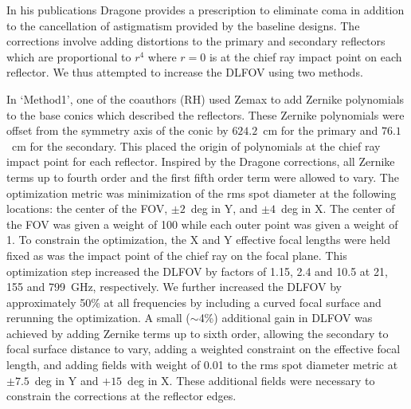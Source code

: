 \documentclass[]{spie}  %
\newcommand{\comr}[1]{\textcolor{red}{#1}}
\newcommand{\comb}[1]{\textcolor{blue}{#1}}
\newcommand{\como}[1]{\textcolor{orange}{#1}}
\begin{document}
In his publications Dragone provides a prescription to eliminate coma
in addition to the cancellation of astigmatism provided by the baseline designs.\cite{dragone_coma} The corrections 
involve adding distortions to the primary and secondary reflectors 
which are proportional to $r^4$ where $r=0$ is at the chief ray impact point on each reflector. 
We thus attempted to increase the DLFOV using two methods. 

In `Method1', one of the coauthors (RH) used Zemax to add Zernike 
polynomials to the base conics which described the reflectors. These Zernike polynomials were offset from the symmetry axis of the conic 
by $624.2$~cm for the primary and $76.1$~cm for the secondary.  
This placed the origin of polynomials at the chief ray impact point for each reflector. 
Inspired by the Dragone corrections, all Zernike terms up to fourth order and the first fifth order term were allowed to vary. 
The optimization metric was minimization of the rms spot diameter at 
the following locations: the center of the FOV, $\pm2$~deg in Y, and $\pm4$~deg in X. The center of the FOV was given a weight of 100
while each outer point was given a weight of 1. To constrain the optimization, the X and Y 
effective focal lengths were held fixed as was the impact point of the chief ray on the focal plane. 
This optimization step increased the DLFOV
by factors of 1.15, 2.4 and 10.5 at 21, 155 and 799~GHz, respectively. 
We further increased the DLFOV by approximately 50\% at all frequencies by including a curved focal surface and rerunning the optimization.
A small ($\sim$4\%) additional gain in DLFOV was achieved by adding Zernike terms 
up to sixth order, allowing the secondary to focal surface distance to vary, adding a weighted constraint on the effective focal length, 
and adding fields with weight of 0.01 to the rms spot diameter metric at $\pm7.5$~deg in Y and $+15$~deg in X. 
These additional fields were necessary to constrain the corrections at the reflector edges.

\end{document}
